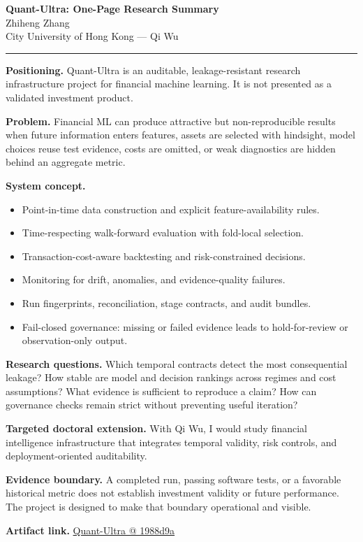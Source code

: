 \documentclass[11pt]{article}
\makeatletter
\newcommand{\ApplicantName}{Zhiheng Zhang}
\newcommand{\ApplicantGitHub}{\href{https://github.com/zhiheng-zhang-Mera/Quant-Ultra/tree/1988d9a8530da91a8158de864d098ea869098923}{Quant-Ultra @ 1988d9a}}
\makeatother
\begin{document}
\begin{center}
{\LARGE\bfseries Quant-Ultra: One-Page Research Summary}\\[0.25em]
{\large \ApplicantName}\\
City University of Hong Kong --- Qi Wu
\end{center}
\vspace{0.35em}\hrule\vspace{0.65em}

\textbf{Positioning.} Quant-Ultra is an auditable, leakage-resistant research infrastructure project for financial machine learning. It is not presented as a validated investment product.

\textbf{Problem.} Financial ML can produce attractive but non-reproducible results when future information enters features, assets are selected with hindsight, model choices reuse test evidence, costs are omitted, or weak diagnostics are hidden behind an aggregate metric.

\textbf{System concept.}
\begin{itemize}
\item Point-in-time data construction and explicit feature-availability rules.
\item Time-respecting walk-forward evaluation with fold-local selection.
\item Transaction-cost-aware backtesting and risk-constrained decisions.
\item Monitoring for drift, anomalies, and evidence-quality failures.
\item Run fingerprints, reconciliation, stage contracts, and audit bundles.
\item Fail-closed governance: missing or failed evidence leads to hold-for-review or observation-only output.
\end{itemize}

\textbf{Research questions.} Which temporal contracts detect the most consequential leakage? How stable are model and decision rankings across regimes and cost assumptions? What evidence is sufficient to reproduce a claim? How can governance checks remain strict without preventing useful iteration?

\textbf{Targeted doctoral extension.} With Qi Wu, I would study financial intelligence infrastructure that integrates temporal validity, risk controls, and deployment-oriented auditability.

\textbf{Evidence boundary.} A completed run, passing software tests, or a favorable historical metric does not establish investment validity or future performance. The project is designed to make that boundary operational and visible.

\textbf{Artifact link.} \ApplicantGitHub
\end{document}
